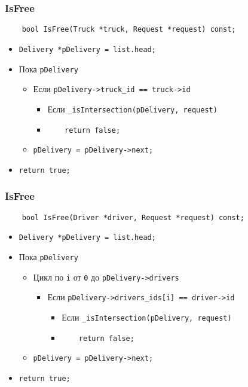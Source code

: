 \subsubsection{IsFree}

\begin{lstlisting}
    bool IsFree(Truck *truck, Request *request) const;
\end{lstlisting}

\begin{itemize}
    \item \verb|Delivery *pDelivery = list.head;|
    \item Пока \verb|pDelivery|
        \begin{itemize}
            \item Если \verb|pDelivery->truck_id == truck->id|
            \begin{itemize}
                \item Если \verb|_isIntersection(pDelivery, request)|
                \item \verb|    return false;|
            \end{itemize}
            \item \verb|pDelivery = pDelivery->next;|
        \end{itemize}
    \item \verb|return true;|
\end{itemize}

\subsubsection{IsFree}

\begin{lstlisting}
    bool IsFree(Driver *driver, Request *request) const;
\end{lstlisting}

\begin{itemize}
    \item \verb|Delivery *pDelivery = list.head;|
    \item Пока \verb|pDelivery|
        \begin{itemize}
            \item Цикл по \verb|i| от \verb|0| до \verb|pDelivery->drivers| 
            \begin{itemize}
                \item Если \verb|pDelivery->drivers_ids[i] == driver->id|
                \begin{itemize}
                    \item Если \verb|_isIntersection(pDelivery, request)|
                    \item \verb|    return false;|
                \end{itemize}
            \end{itemize}
            \item \verb|pDelivery = pDelivery->next;|
        \end{itemize}
    \item \verb|return true;|
\end{itemize}

